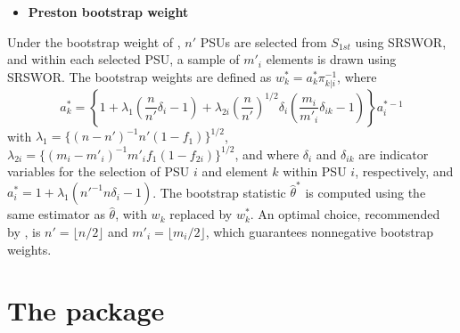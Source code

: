 \begin{itemize}
\tightlist
\item
  \textbf{Preston bootstrap weight}
\end{itemize}

\noindent Under the bootstrap weight of \citet{Preston:2009}, \(n'\) PSUs are selected from \(\textrm{$S$}_{1st}\) using SRSWOR, and within each selected PSU, a sample of \(m'_i\) elements is drawn using SRSWOR. The bootstrap weights are defined as \(w_k^* = a_k^* \pi_{k|i}^{-1}\), where
\[
    a_k^* = \left\{1 + \lambda_1 \left(\frac{n}{n'} \delta_i - 1\right) 
            + \lambda_{2i} \left(\frac{n}{n'}\right)^{1/2} \delta_i \left( \frac{m_i}{m'_i} \delta_{ik} - 1                 \right)\right\} a_i^{*-1}
\]
with \(\lambda_1 = \{(n-n')^{-1} n'(1-f_1)\}^{1/2}\), \(\lambda_{2i} = \{(m_i - m'_i)^{-1} m'_i f_1 (1-f_{2i})\}^{1/2}\), and where \(\delta_i\) and \(\delta_{ik}\) are indicator variables for the selection of PSU \(i\) and element \(k\) within PSU \(i\), respectively, and \(a_i^* = 1 + \lambda_1(n'^{-1} n \delta_i - 1)\). The bootstrap statistic \(\hat{\theta}^*\) is computed using the same estimator as \(\hat{\theta}\), with \(w_k\) replaced by \(w_k^*\). An optimal choice, recommended by \citet{Preston:2009}, is \(n' = \lfloor n/2 \rfloor\) and \(m'_i = \lfloor m_i/2 \rfloor\), which guarantees nonnegative bootstrap weights.

\section{\texorpdfstring{The  package}{The  package}}\label{sec:pkgbootsurv}


